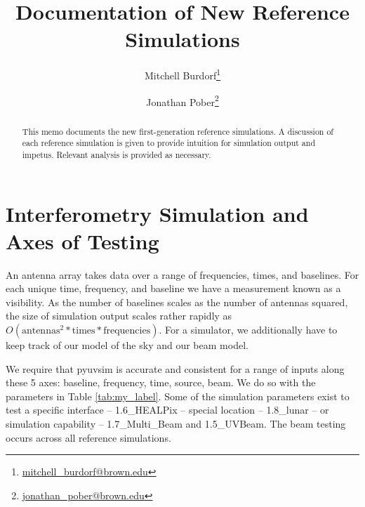 \documentclass{article}
\begin{document}
\title{\vspace{-1.5cm}Documentation of New Reference Simulations}

\author{
  Mitchell Burdorf\footnote{\href{mailto:mitchell_burdorf@brown.edu}{mitchell\_burdorf@brown.edu}}
  \and
  Jonathan Pober\footnote{\href{mailto:jonathan_pober@brown.edu}{jonathan\_pober@brown.edu}}
}

\maketitle

\vspace{-0.8cm}
\begin{abstract}
This memo documents the new first-generation reference simulations. A discussion of each reference simulation is given to provide intuition for simulation output and impetus. Relevant analysis is provided as necessary.
\end{abstract}

\section*{Interferometry Simulation and Axes of Testing}

An antenna array takes data over a range of frequencies, times, and baselines. For each unique time, frequency, and baseline we have a measurement known as a visibility. As the number of baselines scales as the number of antennas squared, the size of simulation output scales rather rapidly as $O(\text{antennas}^2 * \text{times} * \text{frequencies})$. For a simulator, we additionally have to keep track of our model of the sky and our beam model.

We require that pyuvsim is accurate and consistent for a range of inputs along these 5 axes: baseline, frequency, time, source, beam. We do so with the parameters in Table \ref{tab:my_label}. Some of the simulation parameters exist to test a specific interface -- 1.6\_HEALPix -- special location -- 1.8\_lunar -- or simulation capability -- 1.7\_Multi\_Beam and 1.5\_UVBeam. The beam testing occurs across all reference simulations.
\end{document}
